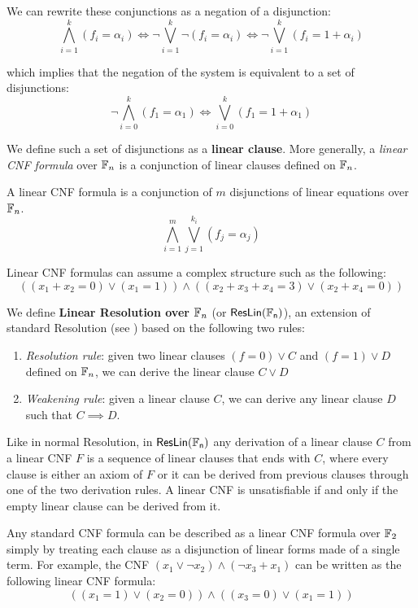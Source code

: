 \noindent
We can rewrite these conjunctions as a negation of a disjunction:
\[\bigwedge_{i = 1}^k (f_i = \alpha_i) \iff \lnot \bigvee_{i = 1}^k \lnot (f_i = \alpha_i) \iff \lnot \bigvee_{i = 1}^k (f_i = 1 + \alpha_i)\]

\noindent
which implies that the negation of the system is equivalent to a set of disjunctions:
\[\lnot \bigwedge_{i = 0}^k (f_1 = \alpha_1) \iff \bigvee_{i = 0}^k (f_1 = 1 + \alpha_1)\]

\noindent
We define such a set of disjunctions as a \textbf{linear clause}. More generally, a \textit{linear CNF formula} over $\mathbb{F}_n$ is a conjunction of linear clauses defined on $\mathbb{F}_n$.

\begin{definition}
 A linear CNF formula is a conjunction of $m$ disjunctions of linear equations over $\mathbb{F}_n$.
    \[\bigwedge_{i = 1}^m \bigvee_{j = 1}^{k_i} (f_j = \alpha_j)\]
\end{definition}

Linear CNF formulas can assume a complex structure such as the following:
\[((x_1+x_2 = 0) \lor (x_1 = 1)) \land ((x_2 + x_3 + x_4 = 3) \lor (x_2 + x_4 = 0))\]

We define \textbf{Linear Resolution over $\mathbb{F}_n$} (or $\mathsf{ResLin(\mathbb{F}_n)}$), an extension of standard Resolution (see ) based on the following two rules:
\begin{enumerate}
    \item \textit{Resolution rule}: given two linear clauses $(f = 0) \lor C$ and $(f = 1) \lor D$ defined on $\mathbb{F}_n$, we can derive the linear clause $C \lor D$
    \item \textit{Weakening rule}: given a linear clause $C$, we can derive any linear clause $D$ such that $C \implies D$.
\end{enumerate}

Like in normal Resolution, in $\mathsf{ResLin(\mathbb{F}_n)}$ any derivation of a linear clause $C$ from a linear CNF $F$ is a sequence of linear clauses that ends with $C$, where every clause is either an axiom of $F$ or it can be derived from previous clauses through one of the two derivation rules. A linear CNF is unsatisfiable if and only if the empty linear clause can be derived from it. 

Any standard CNF formula can be described as a linear CNF formula over $\mathbb{F}_2$ simply by treating each clause as a disjunction of linear forms made of a single term. For example, the CNF $(x_1 \lor \lnot{x_2}) \land (\lnot{x_3} + x_1)$ can be written as the following linear CNF formula:
\[((x_1 = 1) \lor (x_2 = 0)) \land ((x_3 = 0) \lor (x_1 = 1))\]

